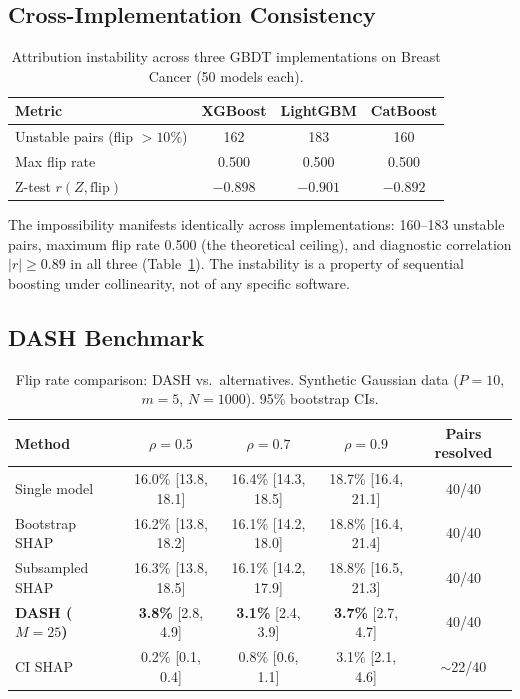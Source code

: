 \subsection{Cross-Implementation Consistency}

\begin{table}[t]
\centering
\caption{Attribution instability across three GBDT implementations on Breast Cancer (50 models each).}
\label{tab:cross-impl}
\small
\begin{tabular}{@{}lccc@{}}
\toprule
Metric & XGBoost & LightGBM & CatBoost \\
\midrule
Unstable pairs (flip $> 10\%$) & 162 & 183 & 160 \\
Max flip rate & 0.500 & 0.500 & 0.500 \\
Z-test $r(Z, \text{flip})$ & $-0.898$ & $-0.901$ & $-0.892$ \\
\bottomrule
\end{tabular}
\end{table}

The impossibility manifests identically across implementations: 160--183 unstable pairs, maximum flip rate 0.500 (the theoretical ceiling), and diagnostic correlation $|r| \geq 0.89$ in all three (Table~\ref{tab:cross-impl}). The instability is a property of sequential boosting under collinearity, not of any specific software.

\subsection{DASH Benchmark}

\begin{table}[t]
\centering
\caption{Flip rate comparison: DASH vs.\ alternatives. Synthetic Gaussian data ($P{=}10$, $m{=}5$, $N{=}1000$). 95\% bootstrap CIs.}
\label{tab:dash-benchmark}
\small
\begin{tabular}{@{}lcccc@{}}
\toprule
Method & $\rho = 0.5$ & $\rho = 0.7$ & $\rho = 0.9$ & Pairs resolved \\
\midrule
Single model       & 16.0\% [13.8, 18.1] & 16.4\% [14.3, 18.5] & 18.7\% [16.4, 21.1] & 40/40 \\
Bootstrap SHAP     & 16.2\% [13.8, 18.2] & 16.1\% [14.2, 18.0] & 18.8\% [16.4, 21.4] & 40/40 \\
Subsampled SHAP    & 16.3\% [13.8, 18.5] & 16.1\% [14.2, 17.9] & 18.8\% [16.5, 21.3] & 40/40 \\
\textbf{DASH ($M{=}25$)} & \textbf{3.8\%} [2.8, 4.9] & \textbf{3.1\%} [2.4, 3.9] & \textbf{3.7\%} [2.7, 4.7] & 40/40 \\
CI SHAP            & 0.2\% [0.1, 0.4]    & 0.8\% [0.6, 1.1]    & 3.1\% [2.1, 4.6]    & $\sim$22/40 \\
\bottomrule
\end{tabular}
\end{table}

